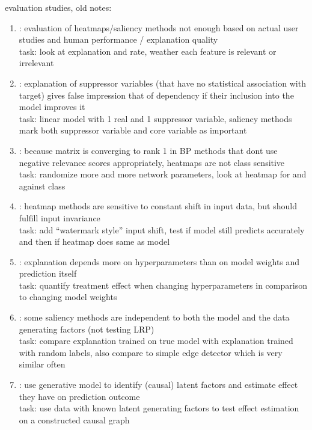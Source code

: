 {\color{gray} 
evaluation studies, old notes:
\begin{enumerate}
      \item \cite{Sixt2022a}: evaluation of heatmaps/saliency methods not enough based on actual user studies and human performance / explanation quality
            \\ task: look at explanation and rate, weather each feature is relevant or irrelevant
      \item \cite{Wilming2023}: explanation of suppressor variables (that have no statistical association with target) gives false impression that of dependency if their inclusion into the model improves it
            \\ task: linear model with 1 real and 1 suppressor variable, saliency methods mark both suppressor variable and core variable as important
      \item \cite{Sixt2020}: because matrix is converging to rank 1 in BP methods that dont use negative relevance scores appropriately, heatmaps are not class sensitive
            \\ task: randomize more and more network parameters, look at heatmap for and against class
      \item \cite{Kindermans2019}: heatmap methods are sensitive to constant shift in input data, but should fulfill input invariance
            \\ task: add “watermark style” input shift, test if model still predicts accurately and then if heatmap does same as model
      \item \cite{Karimi2023}: explanation depends more on hyperparameters than on model weights and prediction itself
            \\ task: quantify treatment effect when changing hyperparameters in comparison to changing model weights
      \item \cite{Adebayo2018}: some saliency methods are independent to both the model and the data generating factors (not testing LRP)
            \\ task: compare explanation trained on true model with explanation trained with random labels, also compare to simple edge detector which is very similar often
      \item \cite{Parafita2019}: use generative model to identify (causal) latent factors and estimate effect they have on prediction outcome
            \\ task: use data with known latent generating factors to test effect estimation on a constructed causal graph

\end{enumerate}}
